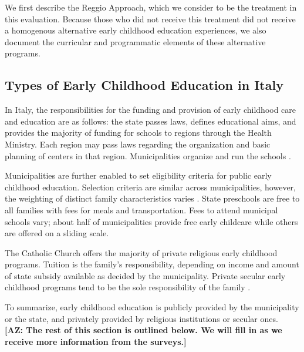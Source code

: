We first describe the Reggio Approach, which we consider to be the treatment in this evaluation. Because those who did not receive this treatment did not receive a homogenous alternative early childhood education experiences, we also document the curricular and programmatic elements of these alternative programs.

\subsection{Types of Early Childhood Education in Italy}

In Italy, the responsibilities for the funding and provision of early childhood care and education are as follows: the state passes laws, defines educational aims, and provides the majority of funding for schools to regions through the Health Ministry. Each region may pass laws regarding the organization and basic planning of centers in that region. Municipalities organize and run the schools \citep{Becchi-Ferrari_1990_Pub-Inf-Centres-Italy}. 

Municipalities are further enabled to set eligibility criteria for public early childhood education. Selection criteria are similar across municipalities, however, the weighting of distinct family characteristics varies \citep{Del-Boca-etal_2016_CESifo-ES}. State preschools are free to all families with fees for meals and transportation. Fees to attend municipal schools vary; about half of municipalities provide free early childcare while others are offered on a sliding scale.

The Catholic Church offers the majority of private religious early childhood programs. Tuition is the family's responsibility, depending on income and amount of state subsidy available as decided by the municipality. Private secular early childhood programs tend to be the sole responsibility of the family \citep{Hohnerlein_2009_Paradox-Public-Preschools}.

To summarize, early childhood education is publicly provided by the municipality or the state, and privately provided by religious institutions or secular ones. \\

\noindent \textbf{[AZ: The rest of this section is outlined below. We will fill in as we receive more information from the surveys.]}

